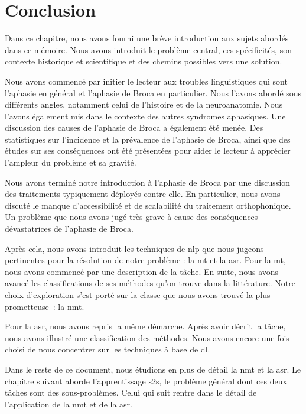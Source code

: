 \section{Conclusion}

Dans ce chapitre, nous avons fourni une brève introduction aux sujets abordés dans ce mémoire.
Nous avons introduit le problème central, ces spécificités, son contexte historique et scientifique 
et des chemins possibles vers une solution.

Nous avons commencé par initier le lecteur aux troubles linguistiques qui sont 
l'aphasie en général et l'aphasie de Broca en particulier.
Nous l'avons abordé sous différents angles, notamment celui de l'histoire et de la neuroanatomie.
Nous l'avons également mis dans le contexte des autres syndromes aphasiques.
Une discussion des causes de l'aphasie de Broca a également été menée.
Des statistiques sur l'incidence et la prévalence de l'aphasie de Broca,
ainsi que des études sur ses conséquences ont été présentées
pour aider le lecteur à apprécier l'ampleur du problème et sa gravité.

Nous avons terminé notre introduction à l'aphasie de Broca 
par une discussion des traitements typiquement déployés contre elle.
En particulier, nous avons discuté le manque d'accessibilité et de scalabilité du traitement orthophonique.
Un problème que nous avons jugé très grave à cause des conséquences dévastatrices de l'aphasie de Broca.

Après cela, nous avons introduit les techniques de \gls{nlp} que nous jugeons pertinentes
pour la résolution de notre problème : la \gls{mt} et la \gls{asr}.
Pour la \gls{mt}, nous avons commencé par une description de la tâche.
En suite, nous avons avancé les classifications de ses méthodes qu'on trouve dans la littérature.
Notre choix d'exploration s'est porté sur la classe que nous avons trouvé la plus prometteuse~:
la \gls{nmt}.

Pour la \gls{asr}, nous avons repris la même démarche.
Après avoir décrit la tâche, nous avons illustré une classification des méthodes.
Nous avons encore une fois choisi de nous concentrer sur les techniques à base de \gls{dl}.

Dans le reste de ce document, nous étudions en plus de détail la \gls{nmt} et la \gls{asr}.
Le chapitre suivant aborde l'apprentissage \gls{s2s}, 
le problème général dont ces deux tâches sont des sous-problèmes.
Celui qui suit rentre dans le détail de l'application de la \gls{nmt} et de la \gls{asr}.
